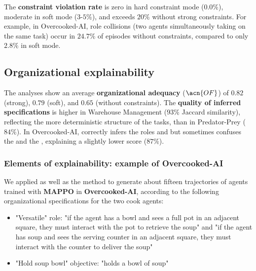 The \textbf{constraint violation rate} is zero in hard constraint mode ($0.0\%$), moderate in soft mode ($3$-$5\%$), and exceeds $20\%$ without strong constraints.
For example, in Overcooked-AI, role collisions (two agents simultaneously taking on the same task) occur in $24.7\%$ of episodes without constraints, compared to only $2.8\%$ in soft mode.

\subsection*{Organizational explainability}

The  analyses show an average \textbf{organizational adequacy} ($\acn{OF}$) of $0.82$ (strong), $0.79$ (soft), and $0.65$ (without constraints).
The \textbf{quality of inferred specifications} is higher in Warehouse Management ($93\%$ Jaccard similarity), reflecting the more deterministic structure of the tasks, than in Predator-Prey ($84\%$).
In Overcooked-AI,  correctly infers the roles  and  but sometimes confuses the  and the , explaining a slightly lower score ($87\%$).


\subsubsection*{Elements of explainability: example of Overcooked-AI}

We applied  as well as the  method to generate about fifteen trajectories of agents trained with \textbf {MAPPO} in \textbf{Overcooked-AI}, according to the following organizational specifications for the two cook agents:
%
\begin{itemize}
  \item "Versatile" role: "if the agent has a bowl and sees a full pot in an adjacent square, they must interact with the pot to retrieve the soup" and "if the agent has soup and sees the serving counter in an adjacent square, they must interact with the counter to deliver the soup"
  \item "Hold soup bowl" objective: "holds a bowl of soup"
\end{itemize}

